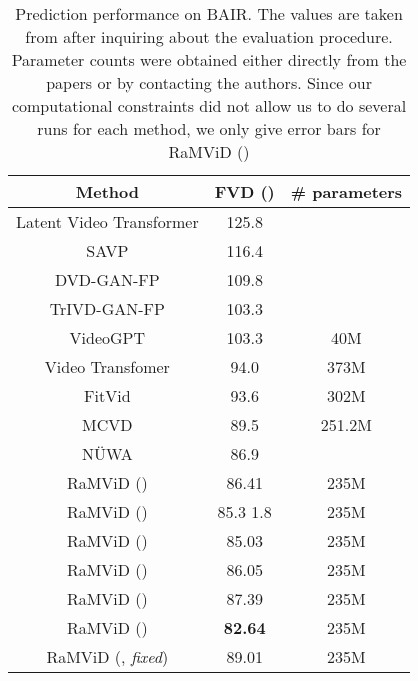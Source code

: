 \documentclass[10pt]{article} \usepackage[accepted]{tmlr}
\begin{document}
\begin{table}[h]
    \centering
    \caption{Prediction performance on BAIR. The values are taken from \citet{babaeizadeh2021fitvid} after inquiring about the evaluation procedure. Parameter counts were obtained either directly from the papers or by contacting the authors. Since our computational constraints did not allow us to do several runs for each method, we only give error bars for RaMViD ()}
    \begin{tabular}{ccc}
        \toprule
        \textbf{Method} &  \textbf{FVD} () & \textbf{\# parameters} \\
        \midrule
        Latent Video Transformer \citep{Rakhimov_2020} & 125.8 \\
        SAVP \citep{lee_2018_savp} & 116.4 \\
        DVD-GAN-FP \citep{clark_2019_dvd_gan} & 109.8 \\
        TrIVD-GAN-FP \citep{Luc_2020} & 103.3 \\
        VideoGPT \citep{yan_2021} & 103.3 & 40M \\
        Video Transfomer \citep{Weissenborn2020Scaling} & 94.0 & 373M \\
        FitVid \citep{babaeizadeh2021fitvid} & 93.6 & 302M \\
        MCVD \citep{voleti_2022}& 89.5 & 251.2M \\
        N\" UWA \citep{wu_2021_nuwa} & 86.9 \\
        \midrule 
        RaMViD () & 86.41 & 235M\\
        RaMViD () & 85.3  1.8 & 235M \\
        RaMViD () & 85.03 & 235M \\
        RaMViD () & 86.05 & 235M \\
        RaMViD () & 87.39 & 235M \\
        RaMViD () & \textbf{82.64} & 235M \\
        RaMViD (, \emph{fixed}) & 89.01 & 235M \\
        \bottomrule
    \end{tabular}
    
    \label{tab:bair}
\end{table}
\end{document}
